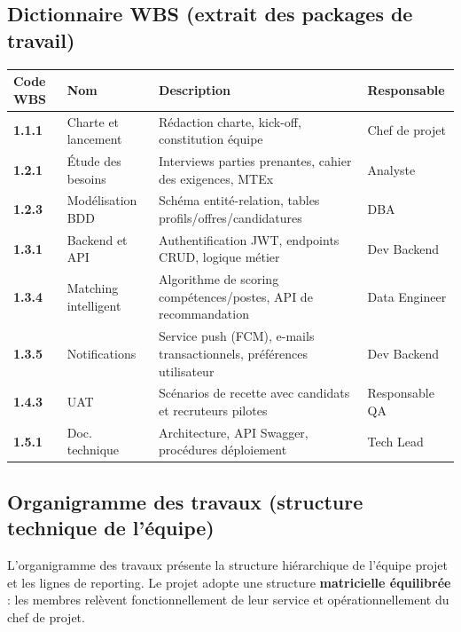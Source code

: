 \documentclass[11pt,a4paper]{article}
\begin{document}
\subsection{Dictionnaire WBS (extrait des packages de travail)}

\small
\begin{tabularx}{\textwidth}{|>{\bfseries}p{1.5cm}|p{2.5cm}|X|p{2.5cm}|}
    \hline
    \rowcolor{ifrigray}
    Code WBS & Nom & Description & Responsable \\
    \hline
    1.1.1 & Charte et lancement & Rédaction charte, kick-off, constitution équipe & Chef de projet \\
    \hline
    1.2.1 & Étude des besoins & Interviews parties prenantes, cahier des exigences, MTEx & Analyste \\
    \hline
    1.2.3 & Modélisation BDD & Schéma entité-relation, tables profils/offres/candidatures & DBA \\
    \hline
    1.3.1 & Backend et API & Authentification JWT, endpoints CRUD, logique métier & Dev Backend \\
    \hline
    1.3.4 & Matching intelligent & Algorithme de scoring compétences/postes, API de recommandation & Data Engineer \\
    \hline
    1.3.5 & Notifications & Service push (FCM), e-mails transactionnels, préférences utilisateur & Dev Backend \\
    \hline
    1.4.3 & UAT & Scénarios de recette avec candidats et recruteurs pilotes & Responsable QA \\
    \hline
    1.5.1 & Doc. technique & Architecture, API Swagger, procédures déploiement & Tech Lead \\
    \hline
\end{tabularx}
\normalsize

\subsection{Organigramme des travaux (structure technique de l'équipe)}

L'organigramme des travaux présente la structure hiérarchique de l'équipe projet et les lignes de reporting. Le projet adopte une structure \textbf{matricielle équilibrée} : les membres relèvent fonctionnellement de leur service et opérationnellement du chef de projet.
\end{document}
